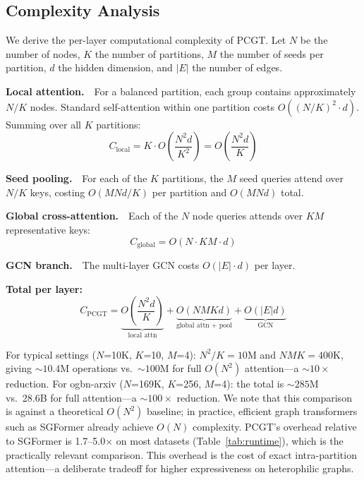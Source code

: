 \documentclass[manuscript, screen, review, anonymous]{acmart}
\begin{document}
\subsection{Complexity Analysis}
\label{sec:complexity}

We derive the per-layer computational complexity of PCGT. Let $N$ be the number of nodes, $K$ the number of partitions, $M$ the number of seeds per partition, $d$ the hidden dimension, and $|E|$ the number of edges.

\textbf{Local attention.}~~For a balanced partition, each group contains approximately $N/K$ nodes. Standard self-attention within one partition costs $O((N/K)^2 \cdot d)$. Summing over all $K$ partitions:
\begin{equation}
C_\text{local} = K \cdot O\!\left(\frac{N^2 d}{K^2}\right) = O\!\left(\frac{N^2 d}{K}\right)
\end{equation}

\textbf{Seed pooling.}~~For each of the $K$ partitions, the $M$ seed queries attend over $N/K$ keys, costing $O(MNd/K)$ per partition and $O(MNd)$ total.

\textbf{Global cross-attention.}~~Each of the $N$ node queries attends over $KM$ representative keys:
\begin{equation}
C_\text{global} = O(N \cdot KM \cdot d)
\end{equation}

\textbf{GCN branch.}~~The multi-layer GCN costs $O(|E| \cdot d)$ per layer.

\textbf{Total per layer:}
\begin{equation}
C_\text{PCGT} = \underbrace{O\!\left(\frac{N^2 d}{K}\right)}_{\text{local attn}} + \underbrace{O(NMKd)}_{\text{global attn + pool}} + \underbrace{O(|E|d)}_{\text{GCN}}
\end{equation}

For typical settings ($N$=10K, $K$=10, $M$=4): $N^2/K = 10$M and $NMK = 400$K, giving ${\sim}10.4$M operations vs.\ ${\sim}100$M for full $O(N^2)$ attention---a ${\sim}10\times$ reduction. For ogbn-arxiv ($N$=169K, $K$=256, $M$=4): the total is ${\sim}285$M vs.\ 28.6B for full attention---a ${\sim}100\times$ reduction. We note that this comparison is against a theoretical $O(N^2)$ baseline; in practice, efficient graph transformers such as SGFormer already achieve $O(N)$ complexity. PCGT's overhead relative to SGFormer is 1.7--5.0$\times$ on most datasets (Table~\ref{tab:runtime}), which is the practically relevant comparison. This overhead is the cost of exact intra-partition attention---a deliberate tradeoff for higher expressiveness on heterophilic graphs.
\end{document}
